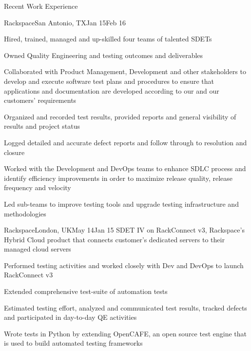 \documentclass{resume} %
\begin{document}
\begin{rSection}{Recent Work Experience}
\begin{rSubsection}{Rackspace}{San Antonio, TX}{Jan 15}{Feb 16}
\item Hired, trained, managed and up-skilled four teams of talented SDETs
\item Owned Quality Engineering and testing outcomes and deliverables
\item Collaborated with Product Management, Development and other stakeholders to develop and execute software test plans and procedures to ensure that applications and documentation are developed according to our and our customers' requirements
\item Organized and recorded test results, provided reports and general visibility of results and project status
\item Logged detailed and accurate defect reports and follow through to resolution and closure
\item Worked with the Development and DevOps teams to enhance SDLC process and identify efficiency improvements in order to maximize release quality, release frequency and velocity
\item Led sub-teams to improve testing tools and upgrade testing infrastructure and methodologies

\end{rSubsection}


\begin{rSubsection}{Rackspace}{London, UK}{May 14}{Jan 15}
{SDET IV on RackConnect v3, Rackspace's Hybrid Cloud product that connects customer's dedicated servers to their managed cloud servers}

\item Performed testing activities and worked closely with Dev and DevOps to launch RackConnect v3
\item Extended comprehensive test-suite of automation tests
\item Estimated testing effort, analyzed and communicated test results, tracked defects and participated in day-to-day QE activities
\item Wrote tests in Python by extending OpenCAFE, an open source test engine that is used to build automated testing frameworks
\end{rSubsection}
\end{rSection}

\end{document}

